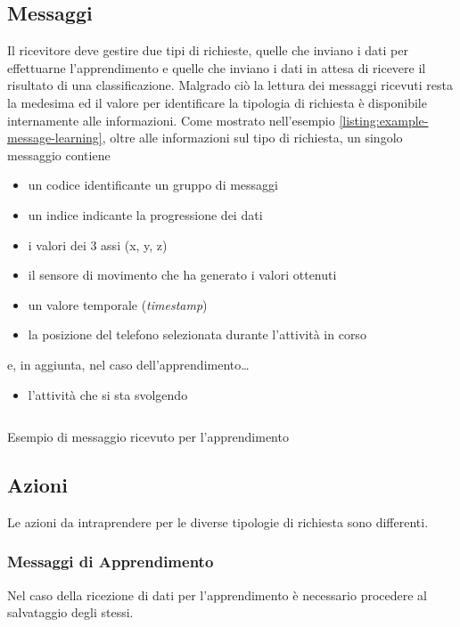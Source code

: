 \subsection{Messaggi}
Il ricevitore deve gestire due tipi di richieste, quelle che inviano i dati per effettuarne l'apprendimento e quelle che inviano
i dati in attesa di ricevere il risultato di una classificazione. Malgrado ciò la lettura dei messaggi ricevuti resta la medesima ed il 
valore per identificare la tipologia di richiesta è disponibile internamente alle informazioni.
\vspace{5mm} %
\newline
Come mostrato nell'esempio \ref{listing:example-message-learning}, oltre alle informazioni sul tipo di richiesta, un singolo messaggio contiene 
\begin{itemize}
    \item un codice identificante un gruppo di messaggi
    \item un indice indicante la progressione dei dati
    \item i valori dei 3 assi (x, y, z)
    \item il sensore di movimento che ha generato i valori ottenuti
    \item un valore temporale (\textit{timestamp})
    \item la posizione del telefono selezionata durante l'attività in corso
\end{itemize}
e, in aggiunta, nel caso dell'apprendimento\dots
\begin{itemize}
    \item l'attività che si sta svolgendo
\end{itemize}

\begin{listing}[H] 
    \inputminted[frame=single,framesep=10pt]{json}{assets/snippets/server/receiver/message.json}
    \caption{Esempio di messaggio ricevuto per l'apprendimento}
    \label{listing:example-message-learning}
\end{listing}

\newpage
\subsection{Azioni}
Le azioni da intraprendere per le diverse tipologie di richiesta sono differenti. 

\subsubsection{Messaggi di Apprendimento}
Nel caso della ricezione di dati per l'apprendimento è necessario procedere al salvataggio degli stessi.

